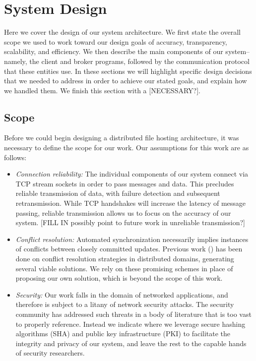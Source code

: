 \section{System Design}
\label{design}
Here we cover the design of our system architecture.
We first state the overall scope we used to work toward our design goals of accuracy, transparency, scalability, and efficiency.
We then describe the main components of our system--namely, the client and broker
programs, followed by the communication protocol that these entities use.
In these sections we will highlight specific design decisions that we needed to address
in order to achieve our stated goals,
and explain how we handled them.
We finish this section with a [NECESSARY?].

\subsection{Scope}
Before we could begin designing a distributed file hosting architecture,
it was necessary to define the scope for our work.
Our assumptions for this work are as follows:
\begin{itemize}
    \item \emph{Connection reliability:} The individual components of our system
    connect via TCP stream sockets in order to pass messages and data.
    This precludes reliable transmission of data, with failure detection
    and subsequent retransmission. While TCP handshakes will increase
    the latency of message passing, reliable transmission allows
    us to focus on the accuracy of our system.
    [FILL IN possibly point to future work in unreliable transmission?]
    \item \emph{Conflict resolution:} Automated synchronization necessarily implies
    instances of conflicts between closely committed updates.
    Previous work (\cite{shakir1998system,hurley2004collaborative}) has been done on conflict resolution strategies in distributed domains,
    generating several viable solutions.
    We rely on these promising schemes in place of proposing our own solution,
    which is beyond the scope of this work.
    \item \emph{Security:} Our work falls in the domain
    of networked applications, and therefore is subject
    to a litany of network security attacks.
    The security community has addressed such threats
    in a body of literature that is too vast to properly reference.
    Instead we indicate where we leverage secure hashing algorithms (SHA)
    and public key infrastructure (PKI) to facilitate
    the integrity and privacy of our system,
    and leave the rest to the capable hands of security researchers.
    \end{itemize}

